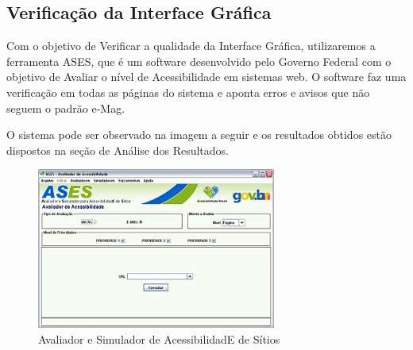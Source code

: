 \subsection{Verificação da Interface Gráfica} %
\label{sub:verifica_o_da_interface_gr_fica}

	Com o objetivo de Verificar a qualidade da Interface Gráfica, utilizaremos a ferramenta ASES, que é um software desenvolvido pelo Governo Federal com o objetivo de Avaliar o nível de Acessibilidade em sistemas web. O software faz uma verificação em todas as páginas do sistema e aponta erros e avisos que não seguem o padrão e-Mag.

	O sistema pode ser observado na imagem a seguir e os resultados obtidos estão dispostos na seção de Análise dos Resultados.

	\begin{figure}[H]
		\centering
		\includegraphics[width=0.7\textwidth]{imagens/ASES}
		\caption{Avaliador e Simulador de AcessibilidadE de Sítios}
		\label{img:ASES}
	\end{figure}
